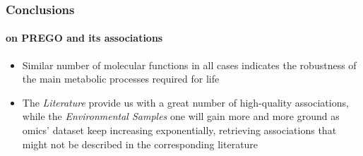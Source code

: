 \documentclass{beamer}
\begin{document}
   \begin{frame}
      \frametitle{Conclusions}
      \framesubtitle{on PREGO and its associations}

      \small
      \begin{itemize}
         \item Similar number of molecular functions in all cases indicates the robustness of the main
         metabolic processes required for life
         \item The \textit{Literature} provide us with a great number of high-quality associations, while 
         the \textit{Environmental Samples} one will gain more and more ground as 
         omics' dataset keep increasing exponentially, retrieving associations that might not be described in the corresponding literature
      \end{itemize}
   \end{frame}
\end{document}
